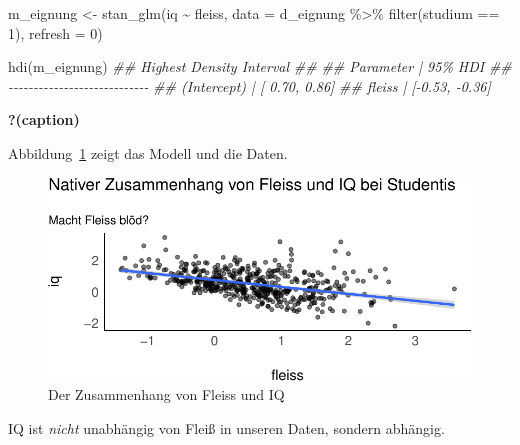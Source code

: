 \documentclass[
  a4paper,
  DIV=11]{scrreprt}
\newenvironment{Shaded}{\begin{snugshade}}{\end{snugshade}}
\newcommand{\AttributeTok}[1]{\textcolor[rgb]{0.40,0.45,0.13}{#1}}
\newcommand{\DecValTok}[1]{\textcolor[rgb]{0.68,0.00,0.00}{#1}}
\newcommand{\DocumentationTok}[1]{\textcolor[rgb]{0.37,0.37,0.37}{\textit{#1}}}
\newcommand{\FunctionTok}[1]{\textcolor[rgb]{0.28,0.35,0.67}{#1}}
\newcommand{\NormalTok}[1]{\textcolor[rgb]{0.00,0.23,0.31}{#1}}
\newcommand{\OtherTok}[1]{\textcolor[rgb]{0.00,0.23,0.31}{#1}}
\newcommand{\SpecialCharTok}[1]{\textcolor[rgb]{0.37,0.37,0.37}{#1}}
\theoremstyle{definition}
\theoremstyle{remark}
\begin{document}
\begin{Shaded}
\begin{Highlighting}[]
\NormalTok{m\_eignung }\OtherTok{\textless{}{-}}
  \FunctionTok{stan\_glm}\NormalTok{(iq }\SpecialCharTok{\textasciitilde{}}\NormalTok{ fleiss, }\AttributeTok{data =}\NormalTok{ d\_eignung }\SpecialCharTok{\%\textgreater{}\%}  \FunctionTok{filter}\NormalTok{(studium }\SpecialCharTok{==} \DecValTok{1}\NormalTok{), }\AttributeTok{refresh =} \DecValTok{0}\NormalTok{)}

\FunctionTok{hdi}\NormalTok{(m\_eignung)}
\DocumentationTok{\#\# Highest Density Interval}
\DocumentationTok{\#\# }
\DocumentationTok{\#\# Parameter   |        95\% HDI}
\DocumentationTok{\#\# {-}{-}{-}{-}{-}{-}{-}{-}{-}{-}{-}{-}{-}{-}{-}{-}{-}{-}{-}{-}{-}{-}{-}{-}{-}{-}{-}{-}}
\DocumentationTok{\#\# (Intercept) | [ 0.70,  0.86]}
\DocumentationTok{\#\# fleiss      | [{-}0.53, {-}0.36]}
\end{Highlighting}
\end{Shaded}

\begin{table}

\caption{\textbf{?(caption)}}

\end{table}

Abbildung~\ref{fig-eignung} zeigt das Modell und die Daten.

\begin{figure}

{\centering \includegraphics{./kausal_files/figure-pdf/fig-eignung-1.pdf}

}

\caption{\label{fig-eignung}Der Zusammenhang von Fleiss und IQ}

\end{figure}

IQ ist \emph{nicht} unabhängig von Fleiß in unseren Daten, sondern
abhängig.
\end{document}
